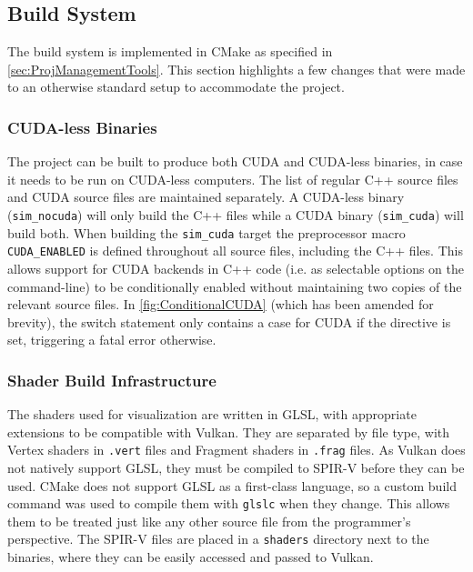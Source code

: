 \subsection{Build System}
The build system is implemented in CMake as specified in \cref{sec:ProjManagementTools}. %
This section highlights a few changes that were made to an otherwise standard setup to accommodate the project.

\subsubsection{CUDA-less Binaries}
The project can be built to produce both CUDA and CUDA-less binaries, in case it needs to be run on CUDA-less computers.
The list of regular C++ source files and CUDA source files are maintained separately. A CUDA-less binary (\texttt{sim\_nocuda}) will only build the C++ files while a CUDA binary (\texttt{sim\_cuda}) will build both.
When building the \texttt{sim\_cuda} target the preprocessor macro \texttt{CUDA\_ENABLED} is defined throughout all source files, including the C++ files.
This allows support for CUDA backends in C++ code (i.e. as selectable options on the command-line) to be conditionally enabled without maintaining two copies of the relevant source files.
In \cref{fig:ConditionalCUDA} (which has been amended for brevity), the switch statement only contains a case for CUDA if the directive is set, triggering a fatal error otherwise.



\subsubsection{Shader Build Infrastructure} %
The shaders used for visualization are written in GLSL, with appropriate extensions to be compatible with Vulkan.
They are separated by file type, with Vertex shaders in \texttt{.vert} files and Fragment shaders in \texttt{.frag} files.
As Vulkan does not natively support GLSL, they must be compiled to SPIR-V before they can be used.
CMake does not support GLSL as a first-class language, so a custom build command was used to compile them with \texttt{glslc}\cite{GoogleLLCShaderc} when they change.
This allows them to be treated just like any other source file from the programmer's perspective.
The SPIR-V files are placed in a \texttt{shaders} directory next to the binaries, where they can be easily accessed and passed to Vulkan.